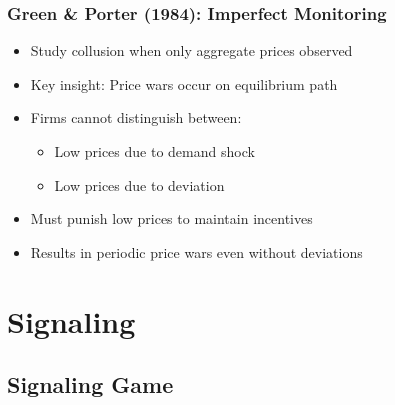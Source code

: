 \documentclass[11pt]{elegantbook_2}
\begin{document}
\subsection{Green \& Porter (1984): Imperfect Monitoring}
\begin{itemize}
    \item Study collusion when only aggregate prices observed
    \item Key insight: Price wars occur on equilibrium path
    \item Firms cannot distinguish between:
    \begin{itemize}
        \item Low prices due to demand shock
        \item Low prices due to deviation
    \end{itemize}
    \item Must punish low prices to maintain incentives
    \item Results in periodic price wars even without deviations
\end{itemize}











\chapter{Signaling}
\section{Signaling Game}
\end{document}
